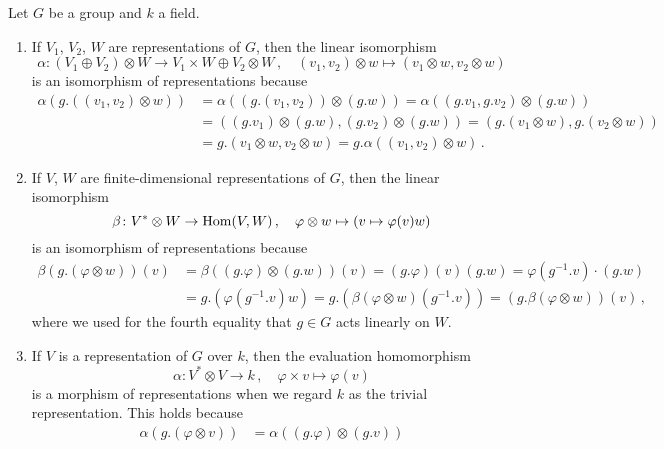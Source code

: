\begin{example}
  Let $G$ be a group and $k$ a field.
  \begin{enumerate}
    \item
      If $V_1$, $V_2$, $W$ are representations of $G$, then the linear isomorphism
      \[
                \alpha
        \colon  (V_1 \oplus V_2) \otimes W
        \to     V_1 \times W \oplus V_2 \otimes W \,,
        \quad   (v_1, v_2) \otimes w
        \mapsto (v_1 \otimes w, v_2 \otimes w)
      \]
      is an isomorphism of representations because
      \begin{align*}
            \alpha( g . ((v_1,v_2) \otimes w) )
        &=  \alpha( (g.(v_1, v_2)) \otimes (g.w) )
         =  \alpha( (g.v_1, g.v_2) \otimes (g.w) )
        \\
        &=  ( (g.v_1) \otimes (g.w) , (g.v_2) \otimes (g.w) )
         =  ( g.(v_1 \otimes w), g.(v_2 \otimes w) )
        \\
        &=  g.(v_1 \otimes w, v_2 \otimes w)
         =  g.\alpha((v_1, v_2) \otimes w) \,.
      \end{align*}
    \item
      If $V$, $W$ are finite-dimensional representations of $G$, then the linear isomorphism
      \[
                \beta
        \colon  V^* \otimes W
        \to     \operatorname{Hom}(V,W) \,,
        \quad   \varphi \otimes w
        \mapsto (v \mapsto \varphi(v) w)
      \]
      is an isomorphism of representations because
      \begin{align*}
            \beta( g.(\varphi \otimes w) )(v)
        &=  \beta( (g.\varphi) \otimes (g.w) )(v)
         =  (g.\varphi)(v) (g.w)
         =  \varphi(g^{-1}.v) \cdot (g.w)
        \\
        &=  g.\left( \varphi(g^{-1}.v) w \right)
         =  g.\left( \beta(\varphi \otimes w)(g^{-1}.v) \right)
         =  (g.\beta(\varphi \otimes w))(v) \,,
      \end{align*}
      where we used for the fourth equality that $g \in G$ acts linearly on $W$.
    \item
      If $V$ is a representation of $G$ over $k$, then the evaluation homomorphism
      \[
                \alpha
        \colon  V^* \otimes V
        \to     k \,,
        \quad   \varphi \times v
        \mapsto \varphi(v)
      \]
      is a morphism of representations when we regard $k$ as the trivial representation.
      This holds because
      \begin{align*}
            \alpha(g.(\varphi \otimes v))
        &=  \alpha((g.\varphi) \otimes (g.v))

\end{align*}
\end{enumerate}
\end{example}
